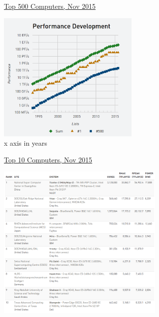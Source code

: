 \documentclass[xcolor=x11names,compress]{beamer}
\renewcommand{\(}{\begin{columns}}
\renewcommand{\)}{\end{columns}}
\newcommand{\<}[1]{\begin{column}{#1}}
\renewcommand{\>}{\end{column}}
\begin{document}
\begin{frame}{\href{http://www.top500.org/}{Top 500 Computers, Nov 2015}}

\begin{center}
\includegraphics[height=2.5in]{Supercomputers-history-2015}\\
x axis in years
\end{center}

\end{frame}

\begin{frame}{\href{http://en.wikipedia.org/wiki/TOP500}{Top 10 Computers, Nov 2015}}

\begin{center}
\includegraphics[height=3in]{2015-top-10}
\end{center}

\end{frame}
\end{document}
